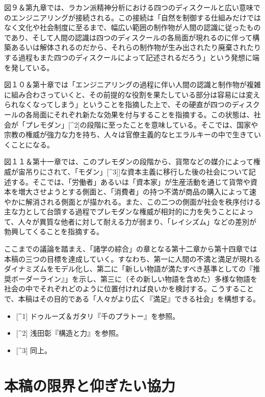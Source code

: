 \documentclass[
]{ltjsarticle}
\providecommand{\tightlist}{%
  \setlength{\itemsep}{0pt}\setlength{\parskip}{0pt}}
\begin{document}
図９＆第九章では、ラカン派精神分析における四つのディスクールと広い意味でのエンジニアリングが接続される。この接続は「自然を制御する仕組みだけではなく文化や社会制度に至るまで、幅広い範囲の制作物が人間の認識に従ったものであり、そして人間の認識は四つのディスクールの各局面が現れるのに伴って構築あるいは解体されるのだから、それらの制作物が生み出されたり廃棄されたりする過程もまた四つのディスクールによって記述されるだろう」という発想に端を発している。

図１０＆第十章では「エンジニアリングの過程に伴い人間の認識と制作物が複雑に組み合わさっていくと、その前提的な役割を果たしている部分は容易には変えられなくなってしまう」ということを指摘した上で、その硬直が四つのディスクールの各局面にそれぞれ新たな効果を付与することを指摘する。この状態は、社会が「プレモダン」{[}\^{}2{]}の段階に至ったことを意味している。そこでは、国家や宗教の権威が強力な力を持ち、人々は官僚主義的なヒエラルキーの中で生きていくことになる。

図１１＆第十一章では、このプレモダンの段階から、貨幣などの媒介によって権威が宙吊りにされて、「モダン」{[}\^{}3{]}{]}な資本主義に移行した後の社会について記述する。そこでは、「労働者」あるいは「資本家」が生産活動を通じて貨幣や資本を増大させようとする側面と、「消費者」の持つ不満が商品の購入によって速やかに解消される側面とが描かれる。また、この二つの側面が社会を秩序付ける主な力として台頭する過程でプレモダンな権威が相対的に力を失うことによって、人々が異質な他者に対して耐える力が弱まり、「レイシズム」などの差別が勃興してくることを指摘する。

ここまでの議論を踏まえ、「諸学の綜合」の章となる第十二章から第十四章では本稿の三つの目標を達成していく。すなわち、第一に人間の不満と満足が現れるダイナミズムをモデル化し、第二に「新しい物語が満たすべき基準としての『推奨ボーダーライン』」を示し、第三に（その新しい物語を含めた）多様な物語を社会の中でそれぞれどのように位置付ければ良いかを検討する。こうすることで、本稿はその目的である「人々がより広く『満足』できる社会」を構想する。

\begin{itemize}
\tightlist
\item
  {[}\^{}1{]} ドゥルーズ＆ガタリ『千のプラトー』を参照。
\item
  {[}\^{}2{]} 浅田彰『構造と力』を参照。
\item
  {[}\^{}3{]} 同上。
\end{itemize}

\section{本稿の限界と仰ぎたい協力}\label{ux672cux7a3fux306eux9650ux754cux3068ux4ef0ux304eux305fux3044ux5354ux529b}
\end{document}
